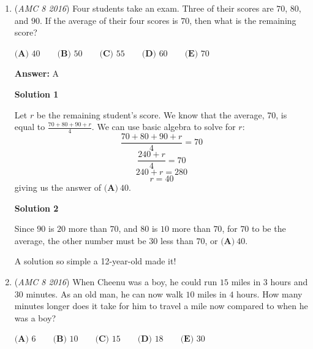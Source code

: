 \begin{enumerate}
 -BananaBall00

 



\textbf{Solution 6(Analyzing the Answer Choices + Simple Math + Guessing)}

We can see that ABC is 1/2 of ABCD, we can then see 24 is out and 18 and 20 are too high. Since this is question 2 the answer would be easy so would be $\boxed{\textbf{(A) } 12}$, since you can divide 24 by 2, and this also looks probable after looking at the image.~Aarnavisthebest

 A solution so simple a 12-year-old made it!

 


	\item (\textit{AMC 8 2016}) Four students take an exam. Three of their scores are $70$, $80$, and $90$. If the average of their four scores is $70$, then what is the remaining score?


 $\textbf{(A) }40\qquad\textbf{(B) }50\qquad\textbf{(C) }55\qquad\textbf{(D) }60\qquad \textbf{(E) }70$

 \textbf{Answer: }A



\textbf{Solution 1}

Let $r$ be the remaining student's score.  We know that the average, 70, is equal to $\frac{70 + 80 + 90 + r}{4}$.  We can use basic algebra to solve for $r$: 
 \[\frac{70 + 80 + 90 + r}{4} = 70\] 
 \[\frac{240 + r}{4} = 70\] 
 \[240 + r = 280\] 
 \[r = 40\] giving us the answer of $\boxed{\textbf{(A)}\ 40}$.

 



\textbf{Solution 2}

Since $90$ is $20$ more than $70$, and $80$ is $10$ more than $70$, for $70$ to be the average, the other number must be $30$ less than $70$, or  $\boxed{\textbf{(A)}\ 40}$.

 A solution so simple a 12-year-old made it!

 


 


	\item (\textit{AMC 8 2016}) When Cheenu was a boy, he could run $15$ miles in $3$ hours and $30$ minutes. As an old man, he can now walk $10$ miles in $4$ hours. How many minutes longer does it take for him to travel a mile now compared to when he was a boy?


 $\textbf{(A) }6\qquad\textbf{(B) }10\qquad\textbf{(C) }15\qquad\textbf{(D) }18\qquad \textbf{(E) }30$


\end{enumerate}
